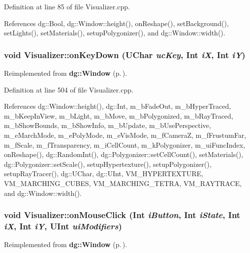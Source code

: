 Definition at line 85 of file Visualizer.cpp.

References dg::Bool, dg::Window::height(), on\-Reshape(), set\-Background(), set\-Lights(), set\-Materials(), setup\-Polygonizer(), and dg::Window::width().
\subsubsection{\setlength{\rightskip}{0pt plus 5cm}void Visualizer::on\-Key\-Down ({\bf UChar} {\em uc\-Key}, {\bf Int} {\em i\-X}, {\bf Int} {\em i\-Y})\hspace{0.3cm}{\tt  [virtual]}}\label{classdg_1_1Visualizer_a7}




Reimplemented from {\bf dg::Window} {\rm (p.\,\pageref{classdg_1_1Window_a10})}.

Definition at line 504 of file Visualizer.cpp.

References dg::Window::height(), dg::Int, m\_\-b\-Fade\-Out, m\_\-b\-Hyper\-Traced, m\_\-b\-Keep\-In\-View, m\_\-b\-Light, m\_\-b\-Move, m\_\-b\-Polygonized, m\_\-b\-Ray\-Traced, m\_\-b\-Show\-Bounds, m\_\-b\-Show\-Info, m\_\-b\-Update, m\_\-b\-Use\-Perspective, m\_\-e\-March\-Mode, m\_\-e\-Poly\-Mode, m\_\-e\-Vis\-Mode, m\_\-f\-Camera\-Z, m\_\-f\-Frustum\-Far, m\_\-f\-Scale, m\_\-f\-Transparency, m\_\-i\-Cell\-Count, m\_\-k\-Polygonizer, m\_\-ui\-Func\-Index, on\-Reshape(), dg::Random\-Int(), dg::Polygonizer::set\-Cell\-Count(), set\-Materials(), dg::Polygonizer::set\-Scale(), setup\-Hypertexture(), setup\-Polygonizer(), setup\-Ray\-Tracer(), dg::UChar, dg::UInt, VM\_\-HYPERTEXTURE, VM\_\-MARCHING\_\-CUBES, VM\_\-MARCHING\_\-TETRA, VM\_\-RAYTRACE, and dg::Window::width().
\subsubsection{\setlength{\rightskip}{0pt plus 5cm}void Visualizer::on\-Mouse\-Click ({\bf Int} {\em i\-Button}, {\bf Int} {\em i\-State}, {\bf Int} {\em i\-X}, {\bf Int} {\em i\-Y}, {\bf UInt} {\em ui\-Modifiers})\hspace{0.3cm}{\tt  [virtual]}}\label{classdg_1_1Visualizer_a10}




Reimplemented from {\bf dg::Window} {\rm (p.\,\pageref{classdg_1_1Window_a16})}.

